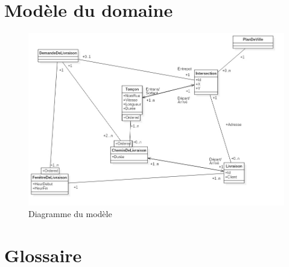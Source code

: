 \documentclass[10pt,a4paper]{book}
\begin{document}
\section{Modèle du domaine}
\begin{figure}[h!]
    \centering
    \includegraphics[scale=0.35]{dia-mod.jpg}
    \caption{Diagramme du modèle}
\end{figure}
\section{Glossaire}
\end{document}
